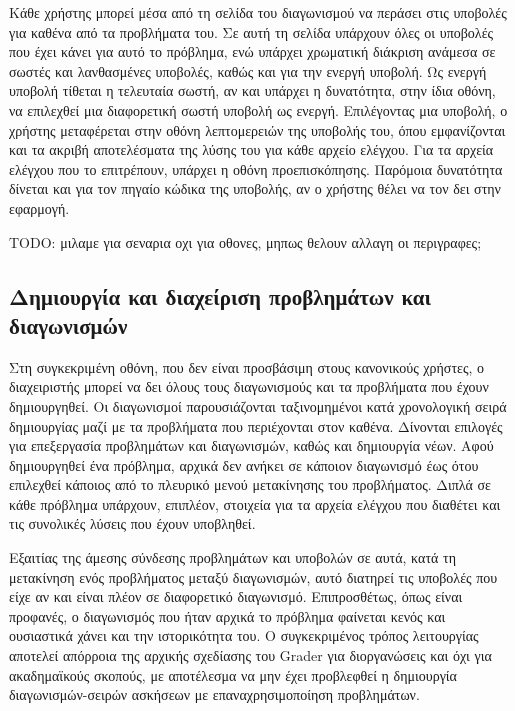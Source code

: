 \documentclass[diploma]{softlab-thesis}
\begin{document}
Κάθε χρήστης μπορεί μέσα από τη σελίδα του διαγωνισμού να περάσει στις υποβολές
για καθένα από τα προβλήματα του. Σε αυτή τη σελίδα υπάρχουν όλες οι υποβολές
που έχει κάνει για αυτό το πρόβλημα, ενώ υπάρχει χρωματική διάκριση ανάμεσα σε
σωστές και λανθασμένες υποβολές, καθώς και για την ενεργή υποβολή. Ως ενεργή
υποβολή τίθεται η τελευταία σωστή, αν και υπάρχει η δυνατότητα, στην ίδια
οθόνη, να επιλεχθεί μια διαφορετική σωστή υποβολή ως ενεργή. Επιλέγοντας μια
υποβολή, ο χρήστης μεταφέρεται στην οθόνη λεπτομερειών της υποβολής του, όπου
εμφανίζονται και τα ακριβή αποτελέσματα της λύσης του για κάθε αρχείο ελέγχου.
Για τα αρχεία ελέγχου που το επιτρέπουν, υπάρχει η οθόνη προεπισκόπησης.
Παρόμοια δυνατότητα δίνεται και για τον πηγαίο κώδικα της υποβολής, αν ο
χρήστης θέλει να τον δει στην εφαρμογή.

TODO: μιλαμε για σεναρια οχι για οθονες, μηπως θελουν αλλαγη οι περιγραφες;
\subsection{Δημιουργία και διαχείριση προβλημάτων και διαγωνισμών}

Στη συγκεκριμένη οθόνη, που δεν είναι προσβάσιμη στους κανονικούς χρήστες, ο
διαχειριστής μπορεί να δει όλους τους διαγωνισμούς και τα προβλήματα που έχουν
δημιουργηθεί. Οι διαγωνισμοί παρουσιάζονται ταξινομημένοι κατά χρονολογική
σειρά δημιουργίας μαζί με τα προβλήματα που περιέχονται στον καθένα. Δίνονται
επιλογές για επεξεργασία προβλημάτων και διαγωνισμών, καθώς και δημιουργία
νέων. Αφού δημιουργηθεί ένα πρόβλημα, αρχικά δεν ανήκει σε κάποιον διαγωνισμό
έως ότου επιλεχθεί κάποιος από το πλευρικό μενού μετακίνησης του προβλήματος.
Διπλά σε κάθε πρόβλημα υπάρχουν, επιπλέον, στοιχεία για τα αρχεία ελέγχου που
διαθέτει και τις συνολικές λύσεις που έχουν υποβληθεί.

\bigskip

Εξαιτίας της άμεσης σύνδεσης προβλημάτων και υποβολών σε αυτά, κατά τη
μετακίνηση ενός προβλήματος μεταξύ διαγωνισμών, αυτό διατηρεί τις υποβολές που
είχε αν και είναι πλέον σε διαφορετικό διαγωνισμό. Επιπροσθέτως, όπως είναι
προφανές, ο διαγωνισμός που ήταν αρχικά το πρόβλημα φαίνεται κενός και
ουσιαστικά χάνει και την ιστορικότητα του. Ο συγκεκριμένος τρόπος λειτουργίας
αποτελεί απόρροια της αρχικής σχεδίασης του Grader για διοργανώσεις και όχι για
ακαδημαϊκούς σκοπούς, με αποτέλεσμα να μην έχει προβλεφθεί η δημιουργία
διαγωνισμών-σειρών ασκήσεων με επαναχρησιμοποίηση προβλημάτων.

\bigskip
\end{document}
